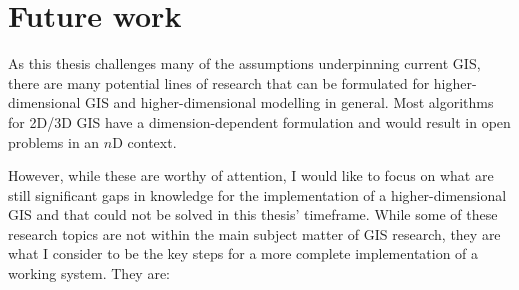 \section{Future work}
\label{se:futurework}

As this thesis challenges many of the assumptions underpinning current GIS, there are many potential lines of research that can be formulated for higher-dimensional GIS and higher-dimensional modelling in general.
Most algorithms for 2D/3D GIS have a dimension-dependent formulation and would result in open problems in an $n$D context.

However, while these are worthy of attention, I would like to focus on what are still significant gaps in knowledge for the implementation of a higher-dimensional GIS and that could not be solved in this thesis' timeframe.
While some of these research topics are not within the main subject matter of GIS research, they are what I consider to be the key steps for a more complete implementation of a working system.
They are:

